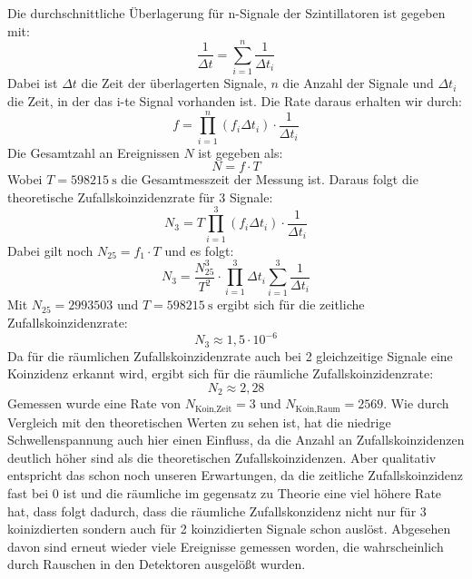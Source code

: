 \documentclass{article}
\begin{document}
Die durchschnittliche Überlagerung für n-Signale der Szintillatoren ist gegeben mit:
\begin{displaymath}
    \frac{1}{\Delta t}= \sum_{i=1}^{n} \frac{1}{\Delta t_i}
\end{displaymath}
Dabei ist $\Delta t$ die Zeit der überlagerten Signale, $n$ die Anzahl der Signale und $\Delta t_i$ die Zeit, in der das i-te Signal vorhanden ist.
Die Rate daraus erhalten wir durch:
\begin{displaymath}
    f=\prod_{i=1}^{n} (f_i \Delta t_i) \cdot \frac{1}{\Delta t_i}
\end{displaymath}
Die Gesamtzahl an Ereignissen $N$ ist gegeben als:
\begin{displaymath}
    N = f \cdot T
\end{displaymath}
Wobei $T=\SI{598215}{\second}$ die Gesamtmesszeit der Messung ist.
Daraus folgt die theoretische Zufallskoinzidenzrate für 3 Signale:
\begin{displaymath}
    N_3=T\prod_{i=1}^{3} (f_i \Delta t_i) \cdot \frac{1}{\Delta t_i}
\end{displaymath}
Dabei gilt noch $N_{25}=f_1 \cdot T$ und es folgt:
\begin{displaymath}
    N_3 = \frac{N_{25}^3}{T^2} \cdot \prod_{i=1}^{3} \Delta t_i \sum_{i=1}^{3}\frac{1}{\Delta t_i}
\end{displaymath}
Mit $N_{25}=2993503$ und $T=\SI{598215}{\second}$ ergibt sich für die zeitliche Zufallskoinzidenzrate:
\begin{displaymath}
    N_3 \approx 1,5 \cdot 10^{-6}    
\end{displaymath}
Da für die räumlichen Zufallskoinzidenzrate auch bei 2 gleichzeitige Signale eine Koinzidenz erkannt wird, ergibt sich für die räumliche Zufallskoinzidenzrate:
\begin{displaymath}
    N_2 \approx 2,28
\end{displaymath}
Gemessen wurde eine Rate von $N_\text{Koin,Zeit}=3$ und $N_\text{Koin,Raum}=2569$.
Wie durch Vergleich mit den theoretischen Werten zu sehen ist, hat die niedrige Schwellenspannung auch hier einen Einfluss, da die Anzahl an Zufallskoinzidenzen deutlich höher sind als die theoretischen Zufallskoinzidenzen.
Aber qualitativ entspricht das schon noch unseren Erwartungen, da die zeitliche Zufallskoinzidenz fast bei 0 ist und die räumliche im gegensatz zu Theorie eine viel höhere Rate hat, dass folgt dadurch, dass
die räumliche Zufallskonzidenz nicht nur für 3 koinizdierten sondern auch für 2 koinzidierten Signale schon auslöst. Abgesehen davon sind erneut wieder viele Ereignisse gemessen worden,
die wahrscheinlich durch Rauschen in den Detektoren ausgelößt wurden.
\end{document}
